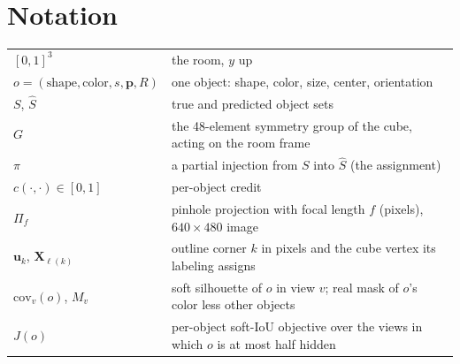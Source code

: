 \documentclass[10pt,a4paper]{article}
\begin{document}
\section{Notation}
\begin{center}\small
\begin{tabular}{@{}ll@{}}
\toprule
$[0,1]^3$ & the room, $y$ up \\
$o=(\text{shape},\text{color},s,\mathbf{p},R)$ & one object: shape, color, size, center, orientation \\
$S$, $\hat S$ & true and predicted object sets \\
$G$ & the 48-element symmetry group of the cube, acting on the room frame \\
$\pi$ & a partial injection from $S$ into $\hat S$ (the assignment) \\
$c(\cdot,\cdot)\in[0,1]$ & per-object credit \\
$\Pi_f$ & pinhole projection with focal length $f$ (pixels), $640\times480$ image \\
$\mathbf{u}_k$, $\mathbf{X}_{\ell(k)}$ & outline corner $k$ in pixels and the cube vertex its labeling assigns \\
$\mathrm{cov}_v(o)$, $M_v$ & soft silhouette of $o$ in view $v$; real mask of $o$'s color less other objects \\
$J(o)$ & per-object soft-IoU objective over the views in which $o$ is at most half hidden \\
\bottomrule
\end{tabular}
\end{center}
\end{document}
